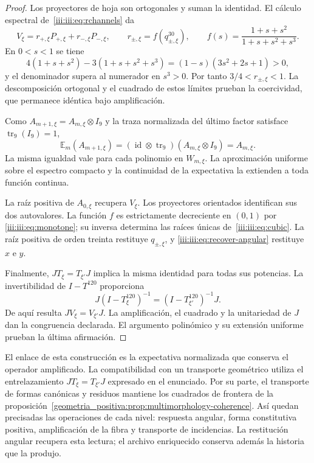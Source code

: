 \begin{proof}
Los proyectores de hoja son ortogonales y suman la identidad. El cálculo
espectral de~\eqref{iii:iii:eq:rchannels} da
\[
 V_\xi=r_{+,\xi}P_{+,\xi}+r_{-,\xi}P_{-,\xi},\qquad
 r_{\pm,\xi}=f(q_{\pm,\xi}^{30}),\qquad
 f(s)=\frac{1+s+s^2}{1+s+s^2+s^3}.
\]
En $0<s<1$ se tiene
\[
 4(1+s+s^2)-3(1+s+s^2+s^3)
 =(1-s)(3s^2+2s+1)>0,
\]
y el denominador supera al numerador en $s^3>0$. Por tanto
$3/4<r_{\pm,\xi}<1$. La descomposición ortogonal y el cuadrado de
estos límites prueban la coercividad, que permanece idéntica bajo
amplificación.

Como $A_{m+1,\xi}=A_{m,\xi}\otimes I_9$ y la traza normalizada
del último factor satisface $\operatorname{tr}_9(I_9)=1$,
\[
 \mathbb E_m(A_{m+1,\xi})
 =(\operatorname{id}\otimes\operatorname{tr}_9)
 (A_{m,\xi}\otimes I_9)=A_{m,\xi}.
\]
La misma igualdad vale para cada polinomio en $W_{m,\xi}$. La
aproximación uniforme sobre el espectro compacto y la continuidad de
la expectativa la extienden a toda función continua.

La raíz positiva de $A_{0,\xi}$ recupera $V_\xi$. Los proyectores
orientados identifican sus dos autovalores. La función $f$ es
estrictamente decreciente en $(0,1)$ por
\eqref{iii:iii:eq:monotone}; su inversa determina las raíces únicas
de~\eqref{iii:iii:eq:cubic}. La raíz positiva de orden treinta
restituye $q_{\pm,\xi}$, y
\eqref{iii:iii:eq:recover-angular} restituye $x$ e $y$.

Finalmente, $JT_\xi=T_{\xi'}J$ implica la misma identidad para
todas sus potencias. La invertibilidad de $I-T^{120}$ proporciona
\[
 J(I-T_\xi^{120})^{-1}
 =(I-T_{\xi'}^{120})^{-1}J.
\]
De aquí resulta $JV_\xi=V_{\xi'}J$. La amplificación, el cuadrado
y la unitariedad de $J$ dan la congruencia declarada. El argumento
polinómico y su extensión uniforme prueban la última afirmación.
\end{proof}

El enlace de esta construcción es la expectativa normalizada que
conserva el operador amplificado. La compatibilidad con un transporte
geométrico utiliza el entrelazamiento $JT_\xi=T_{\xi'}J$ expresado
en el enunciado. Por su parte, el transporte de formas canónicas y
residuos mantiene los cuadrados de frontera de la
proposición~\ref{geometria_positiva:prop:multimorphology-coherence}.
Así quedan precisadas las operaciones de cada nivel: respuesta angular,
forma constitutiva positiva, amplificación de la fibra y transporte de
incidencias. La restitución angular recupera esta lectura; el archivo
enriquecido conserva además la historia que la produjo.

